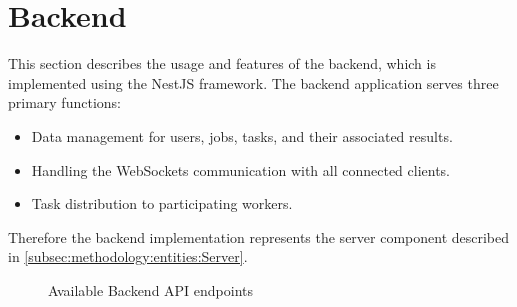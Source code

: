 \section{Backend}
\label{sec:implementation:backend}
This section describes the usage and features of the backend, which is implemented using the NestJS framework. The backend application serves three primary functions: 
\begin{itemize}
    \item Data management for users, jobs, tasks, and their associated results.
    \item Handling the WebSockets communication with all connected clients.
    \item Task distribution to participating workers.
\end{itemize}
Therefore the backend implementation represents the server component described in \autoref{subsec:methodology:entities:Server}.
\begin{figure}[bth]
    \myfloatalign
     \quad \quad
    \caption{Available Backend \ac{API} endpoints}
    \label{fig:implementation:backend}
\end{figure}
